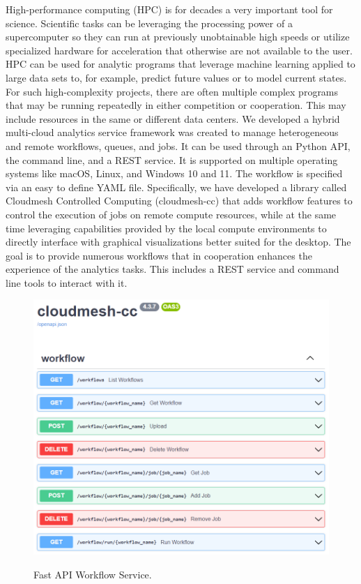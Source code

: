 High-performance computing (HPC) is for decades a very important tool for science. Scientific tasks can be leveraging the processing power of a supercomputer so they can run at previously unobtainable high speeds or utilize specialized hardware for acceleration that otherwise are not available to the user. HPC can be used for analytic programs that leverage machine learning applied to large data sets to, for example, predict future values or to model current states. For such high-complexity projects, 
there are often multiple complex programs that may be running repeatedly in either competition or cooperation. This may include resources in the same or different data centers. We developed 
a hybrid multi-cloud analytics service framework was created to manage heterogeneous and remote workflows, queues, and jobs. It can be used through an Python API, the command line, and a REST service. It is supported on multiple operating systems like macOS, Linux, and Windows 10 and 11. 
The workflow is specified via an easy to define YAML file.
Specifically, we have developed a library called Cloudmesh Controlled Computing (cloudmesh-cc) that adds workflow features to control the execution of jobs on remote compute resources, while at the same time leveraging capabilities provided by the local compute environments to directly interface with graphical visualizations better suited for the desktop. The goal is to provide numerous workflows that in cooperation enhances the experience of the analytics tasks. This includes a REST service and command line tools to interact with it.


\begin{figure}[htb]
\centering\includegraphics[width=0.7\columnwidth]{images/fastapi-service.png}
\label{fig:fastapi-cc}
\caption{Fast API Workflow Service.}
\end{figure}

